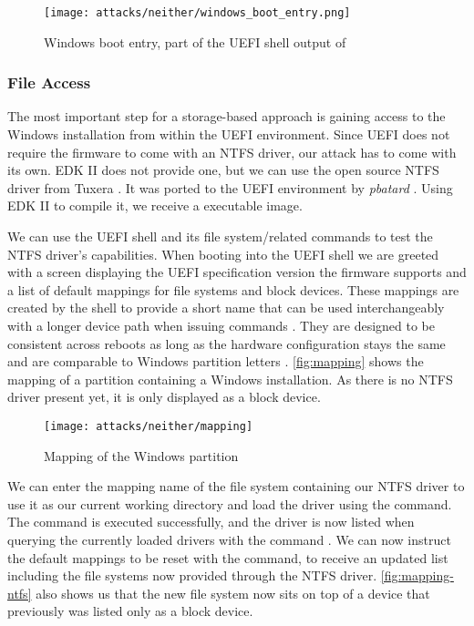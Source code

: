 \begin{figure}[htb]
    \centering
    \texttt{[image: attacks/neither/windows\_boot\_entry.png]}
    \caption{Windows boot entry, part of the \ac{UEFI} shell output of }
    \label{fig:windows-boot-entry}
\end{figure}

\subsubsection{File Access}

The most important step for a storage-based approach is gaining access to the Windows installation from within the \ac{UEFI} environment.
Since \ac{UEFI} does not require the firmware to come with an \ac{NTFS} driver, our attack has to come with its own.
\ac{EDK} II does not provide one, but we can use the open source \ac{NTFS} driver  from Tuxera \cite{ntfs-3g}.
It was ported to the \ac{UEFI} environment by \emph{pbatard} \cite{ntfs-3g-uefi}.
Using \ac{EDK} II to compile it, we receive a  executable image.

We can use the \ac{UEFI} shell and its file system\-/related commands to test the \ac{NTFS} driver's capabilities.
When booting into the \ac{UEFI} shell we are greeted with a screen displaying the \ac{UEFI} specification version the firmware supports and a list of default mappings for file systems and block devices.
These mappings are created by the shell to provide a short name that can be used interchangeably with a longer device path when issuing commands \cite[Section 3.7.2]{uefi-shell-spec}.
They are designed to be consistent across reboots as long as the hardware configuration stays the same and are comparable to Windows partition letters \cite[Appendix A]{uefi-shell-spec}.
\autoref{fig:mapping} shows the mapping of a partition containing a Windows installation.
As there is no \ac{NTFS} driver present yet, it is only displayed as a block device.

\begin{figure}[htb]
    \centering
    \texttt{[image: attacks/neither/mapping]}
    \caption{Mapping of the Windows partition}
    \label{fig:mapping}
\end{figure}

We can enter the mapping name of the file system containing our \ac{NTFS} driver to use it as our current working directory and load the driver using the  command.
The command is executed successfully, and the driver is now listed when querying the currently loaded drivers with the command .
We can now instruct the default mappings to be reset with the  command, to receive an updated list including the file systems now provided through the \ac{NTFS} driver.
\autoref{fig:mapping-ntfs} also shows us that the new file system now sits on top of a device that previously was listed only as a block device.

